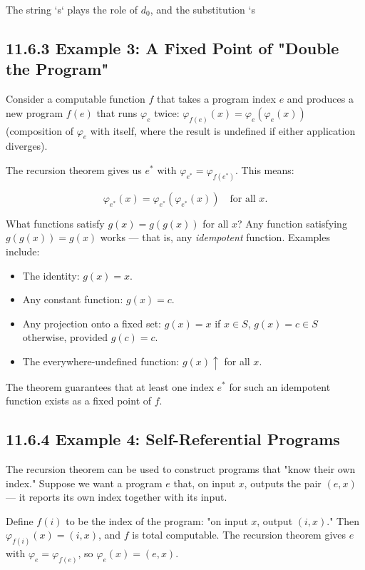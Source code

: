 The string `s` plays the role of $d_0$, and the substitution `s %

\subsection{11.6.3 Example 3: A Fixed Point of "Double the Program"}

Consider a computable function $f$ that takes a program index $e$ and produces a new program $f(e)$ that runs $\varphi_e$ twice: $\varphi_{f(e)}(x) = \varphi_e(\varphi_e(x))$ (composition of $\varphi_e$ with itself, where the result is undefined if either application diverges).

The recursion theorem gives us $e^*$ with $\varphi_{e^*} = \varphi_{f(e^*)}$. This means:

\[\varphi_{e^*}(x) = \varphi_{e^*}(\varphi_{e^*}(x)) \quad \text{for all } x.\]

What functions satisfy $g(x) = g(g(x))$ for all $x$? Any function satisfying $g(g(x)) = g(x)$ works --- that is, any \textit{idempotent} function. Examples include:

\begin{itemize}
\item The identity: $g(x) = x$.
\item Any constant function: $g(x) = c$.
\item Any projection onto a fixed set: $g(x) = x$ if $x \in S$, $g(x) = c \in S$ otherwise, provided $g(c) = c$.
\item The everywhere-undefined function: $g(x)\!\uparrow$ for all $x$.
\end{itemize}

The theorem guarantees that at least one index $e^*$ for such an idempotent function exists as a fixed point of $f$.

\subsection{11.6.4 Example 4: Self-Referential Programs}

The recursion theorem can be used to construct programs that "know their own index." Suppose we want a program $e$ that, on input $x$, outputs the pair $(e, x)$ --- it reports its own index together with its input.

Define $f(i)$ to be the index of the program: "on input $x$, output $(i, x)$." Then $\varphi_{f(i)}(x) = (i, x)$, and $f$ is total computable. The recursion theorem gives $e$ with $\varphi_e = \varphi_{f(e)}$, so $\varphi_e(x) = (e, x)$.

